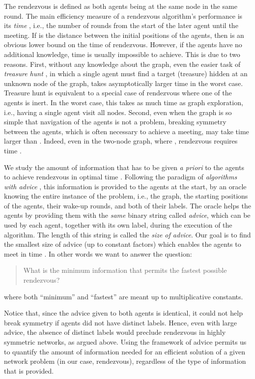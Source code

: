\documentclass{llncs}
\begin{document}
The rendezvous is defined as both agents being at the same node in the same round.
The main efficiency measure of a rendezvous algorithm's performance is its {\em time} , i.e., the number of rounds from the start of the later agent until the meeting.
If  is the distance between the initial positions of the agents, then  is an obvious lower bound on the time of rendezvous. However, if the agents have no additional knowledge,
time  is usually impossible to achieve. This is due to two reasons. First, without any knowledge about the graph, even the easier task of {\em treasure hunt} \cite{TSZ07}, in
which a single agent must find a target (treasure) hidden at an unknown node of the graph, takes asymptotically larger time  in the worst case. Treasure hunt is equivalent to a special case of rendezvous  where one of the agents is inert. In the worst case, this takes as much time as graph exploration, i.e., having a single agent visit all nodes.
Second, even when the graph is so simple that navigation of the agents is not a problem, breaking symmetry between the agents, which is often necessary to achieve a meeting, may take time larger than .
Indeed, even in the two-node graph, where , rendezvous requires time  \cite{DFKP}. 

We study the amount of information that has to be given  {\em a priori} to the agents to achieve rendezvous in optimal time .
Following the paradigm of {\em algorithms
with advice}  \cite{AKM01,CFP,CFIKP,DP,EFKR,FGIP,FIP1,FIP2,FKL,FP,FPR,GPPR02,IKP,KKKP02,KKP05,SN,TZ05}, this information is provided to the agents at the start, by an oracle knowing the entire instance of the problem, i.e., the graph, the starting  positions of the agents, their wake-up rounds, and both of their labels. The oracle
helps the agents by providing them with the {\em same} binary string called {\em advice}, which can be used by each agent, together with its own label, during the execution of the algorithm. The length of this
string is called the {\em size of advice}.  Our goal is to find the smallest size of advice (up to constant factors) which enables the agents to meet in time .
In other words we want to answer the question:

\begin{quotation}
What is the minimum information that permits the fastest possible rendezvous?
\end{quotation}

where both ``minimum'' and ``fastest'' are meant up to multiplicative constants. 

Notice that, since the advice given to both agents is identical, it could not help break symmetry if agents did not have distinct labels.
Hence, even with large advice, the absence of distinct labels would preclude rendezvous in highly symmetric networks, as argued above.
Using the framework of advice permits us to quantify the amount of information
needed for an efficient solution of a given network problem (in our case, rendezvous), regardless of the type of information that is provided. 
\end{document}
